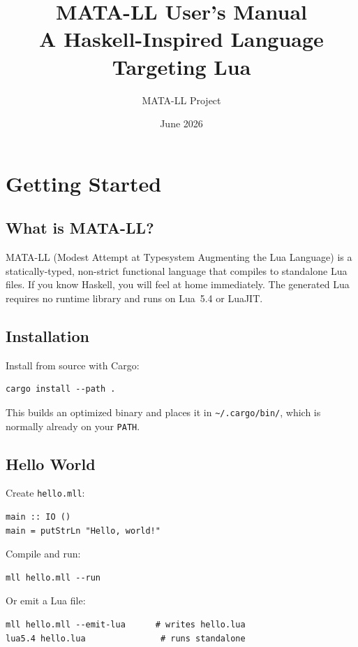 \documentclass[11pt,a4paper]{article}
\title{\textbf{MATA-LL User's Manual}\\[6pt]
  \large A Haskell-Inspired Language Targeting Lua}
\author{MATA-LL Project}
\date{June 2026}
\begin{document}
\maketitle
\tableofcontents
\clearpage

\section{Getting Started}

\subsection{What is MATA-LL?}

MATA-LL (Modest Attempt at Typesystem Augmenting the Lua Language) is a
statically-typed, non-strict functional language that compiles to standalone
Lua files.  If you know Haskell, you will feel at home immediately.  The
generated Lua requires no runtime library and runs on Lua~5.4 or LuaJIT.

\subsection{Installation}

Install from source with Cargo:

\begin{lstlisting}[language={}]
cargo install --path .
\end{lstlisting}

This builds an optimized binary and places it in \texttt{\textasciitilde/.cargo/bin/},
which is normally already on your \texttt{PATH}.

\subsection{Hello World}

Create \texttt{hello.mll}:

\begin{lstlisting}
main :: IO ()
main = putStrLn "Hello, world!"
\end{lstlisting}

Compile and run:

\begin{lstlisting}[language={}]
mll hello.mll --run
\end{lstlisting}

Or emit a Lua file:

\begin{lstlisting}[language={}]
mll hello.mll --emit-lua      # writes hello.lua
lua5.4 hello.lua               # runs standalone
\end{lstlisting}
\end{document}
